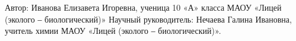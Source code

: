 


\makeProcTitleSchool





Автор: Иванова Елизавета Игоревна,
ученица 10 «А» класса
МАОУ «Лицей (эколого ‒ биологический)»
Научный руководитель:
Нечаева Галина Ивановна,
учитель химии
МАОУ «Лицей (эколого ‒ биологический)».
